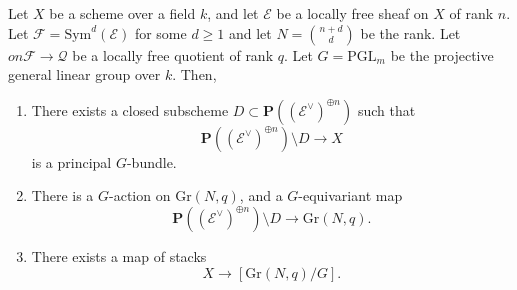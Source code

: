 \begin{lemma}
\label{lemma-grassman-quotient-stack-map}
Let $X$ be a scheme over a field $k$, and let $\mathcal{E}$ be a%
locally free sheaf on $X$ of rank $n$.
Let $\mathcal{F} = \mathrm{Sym}^d(\mathcal{E})$ for some $d \geq 1$ and
let $N = \binom{n + d}{d}$ be the rank.
Let $on \mathcal{F} \to \mathcal{Q}$ be a locally free quotient of rank $q$.
Let $G = \mathrm{PGL}_m$ be the projective general linear group over $k$.
Then,
\begin{enumerate}
\item There exists a closed subscheme $D \subset
\mathbf{P}((\mathcal{E}^\vee)^{\oplus n})$ such that
$$
\mathbf{P}((\mathcal{E}^\vee)^{\oplus n}) \setminus D \longrightarrow X
$$
is a principal $G$-bundle.
\item There is a $G$-action on $\mathrm{Gr}(N,q)$, and
a $G$-equivariant map
$$
\mathbf{P}((\mathcal{E}^\vee)^{\oplus n}) \setminus D \longrightarrow
\mathrm{Gr}(N,q).
$$
\item There exists a map of stacks
$$
X \longrightarrow [\mathrm{Gr}(N,q)/G].
$$
\end{enumerate}
\end{lemma}
